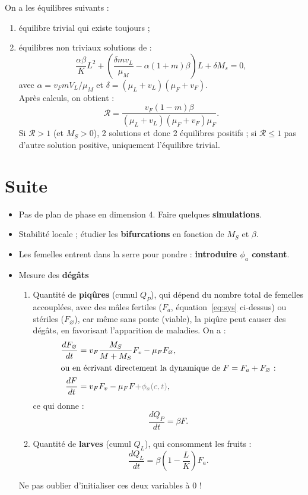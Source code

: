 \documentclass[11pt,twoside]{article}
\begin{document}
On a les équilibres suivants :
\begin{enumerate}
\item équilibre trivial qui existe toujours ;
\item équilibres non triviaux solutions de :
  \begin{equation*}
    \frac{\alpha \beta}{K} L^2 + \left( \frac{\delta m v_L}{\mu_M} - \alpha (1+m) \beta \right) L + \delta M_s = 0,
  \end{equation*}
  avec $\alpha=v_F m V_L/\mu_M$ et $\delta=(\mu_L+v_L)(\mu_F+v_F)$. \\
  Après calculs, on obtient :
  \begin{equation*}
    \mathcal{R}=\frac{v_F (1-m) \beta}{(\mu_L+v_L)(\mu_F+v_F)\mu_F}.
  \end{equation*}
  Si $\mathcal{R}>1$ (et $M_S>0$), 2 solutions et donc 2 équilibres positifs ; si $\mathcal{R}\leqslant 1$ pas d'autre solution positive, uniquement l'équilibre trivial.
\end{enumerate}


\section{Suite}

\begin{itemize}
\item Pas de plan de phase en dimension 4. Faire quelques \textbf{simulations}.
\item Stabilité locale ; étudier les \textbf{bifurcations} en fonction de $M_S$ et $\beta$.
\item Les femelles entrent dans la serre pour pondre : \textbf{introduire $\phi_a$ constant}.
\item Mesure des \textbf{dégâts} 
  \begin{enumerate}
  \item Quantité de \textbf{piqûres} (cumul $Q_P$), qui dépend du nombre total de femelles accouplées, avec des mâles fertiles ($F_a$, équation~\eqref{eq:sys} ci-dessus) ou stériles ($F_{\varnothing}$), car même sans ponte (viable), la piqûre peut causer des dégâts, en favorisant l'apparition de maladies. On a  :
    \begin{align*}
      \frac{d F_{\varnothing}}{dt} &=  v_F \frac{M_S}{M+M_S} F_v  - \mu_F F_{\varnothing}, \\
      \intertext{ou en écrivant directement la dynamique de $F=F_a+F_{\varnothing}$ :}
      \frac{d F}{dt} &= v_F F_v - \mu_F F \textcolor{gray}{+ \phi_a(c,t)}, \\
    \end{align*}
    ce qui donne :
  \begin{equation*}
      \frac{d Q_P}{dt} = \beta F.
    \end{equation*}
  \item Quantité de \textbf{larves} (cumul $Q_L$), qui consomment les fruits :
    \begin{equation*}
      \frac{d Q_L}{dt} = \beta \left(1 - \frac{L}{K} \right) F_a.
    \end{equation*}
  \end{enumerate}
  Ne pas oublier d'initialiser ces deux variables à 0 !  
\end{itemize}
\end{document}
